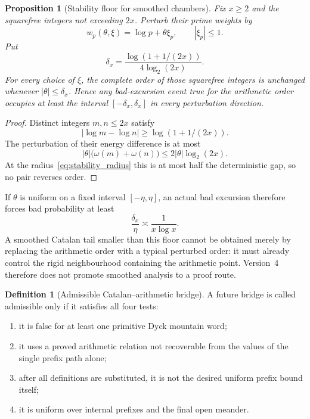 \documentclass[11pt]{amsart}
\numberwithin{equation}{section}
\theoremstyle{plain}
\newtheorem{proposition}[theorem]{Proposition}
\theoremstyle{definition}
\newtheorem{definition}[theorem]{Definition}
\theoremstyle{remark}
\begin{document}
\begin{proposition}[Stability floor for smoothed chambers]
\label{prop:stability_floor}
Fix $x\geq2$ and the squarefree integers not exceeding $2x$.  Perturb their
prime weights by
\begin{equation}
w_p(\theta,\xi)=\log p+\theta\xi_p,
\qquad |\xi_p|\leq1.
\end{equation}
Put
\begin{equation}
\delta_x=
\frac{\log(1+1/(2x))}{4\log_2(2x)}.
\label{eq:stability_radius}
\end{equation}
For every choice of $\xi$, the complete order of those squarefree integers is
unchanged whenever $|\theta|\leq\delta_x$.  Hence any bad-excursion event true
for the arithmetic order occupies at least the interval
$[-\delta_x,\delta_x]$ in every perturbation direction.
\end{proposition}

\begin{proof}
Distinct integers $m,n\leq2x$ satisfy
\begin{equation}
|\log m-\log n|\geq\log(1+1/(2x)).
\end{equation}
The perturbation of their energy difference is at most
\begin{equation}
|\theta|\bigl(\omega(m)+\omega(n)\bigr)
\leq2|\theta|\log_2(2x).
\end{equation}
At the radius~\eqref{eq:stability_radius} this is at most half the deterministic
gap, so no pair reverses order.
\end{proof}

If $\theta$ is uniform on a fixed interval $[-\eta,\eta]$, an actual bad
excursion therefore forces bad probability at least
\begin{equation}
\frac{\delta_x}{\eta}\asymp\frac1{x\log x}.
\label{eq:stability_probability_floor}
\end{equation}
A smoothed Catalan tail smaller than this floor cannot be obtained merely by
replacing the arithmetic order with a typical perturbed order: it must already
control the rigid neighbourhood containing the arithmetic point.  Version~4
therefore does not promote smoothed analysis to a proof route.

\begin{definition}[Admissible Catalan--arithmetic bridge]
\label{def:admissible_bridge}
A future bridge is called admissible only if it satisfies all four tests:
\begin{enumerate}[label=(\roman*)]
\item it is false for at least one primitive Dyck mountain word;
\item it uses a proved arithmetic relation not recoverable from the values of
      the single prefix path alone;
\item after all definitions are substituted, it is not the desired uniform
      prefix bound itself;
\item it is uniform over internal prefixes and the final open meander.
\end{enumerate}
\end{definition}
\end{document}
